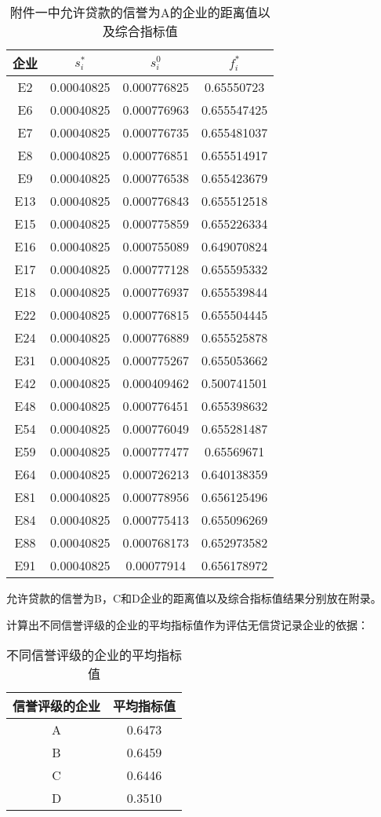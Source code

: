 \documentclass{cumcmthesis}
\begin{document}
\begin{table}[H]   %
	\caption{附件一中允许贷款的信誉为A的企业的距离值以及综合指标值}\label{tab:010} \centering
	\begin{tabular}{cccc}
		\toprule[1.5pt]
		企业 & $s_i^*$    & $s_i^0$        & $f_i^*$         \\
		\midrule[1pt]
E2 & 0.00040825 & 0.000776825 & 0.65550723 \\ 
E6 & 0.00040825 & 0.000776963 & 0.655547425 \\ 
E7 & 0.00040825 & 0.000776735 & 0.655481037 \\ 
E8 & 0.00040825 & 0.000776851 & 0.655514917 \\ 
E9 & 0.00040825 & 0.000776538 & 0.655423679 \\ 
E13 & 0.00040825 & 0.000776843 & 0.655512518 \\ 
E15 & 0.00040825 & 0.000775859 & 0.655226334 \\ 
E16 & 0.00040825 & 0.000755089 & 0.649070824 \\ 
E17 & 0.00040825 & 0.000777128 & 0.655595332 \\ 
E18 & 0.00040825 & 0.000776937 & 0.655539844 \\ 
E22 & 0.00040825 & 0.000776815 & 0.655504445 \\ 
E24 & 0.00040825 & 0.000776889 & 0.655525878 \\ 
E31 & 0.00040825 & 0.000775267 & 0.655053662 \\
E42 & 0.00040825 & 0.000409462 & 0.500741501 \\
E48 & 0.00040825 & 0.000776451 & 0.655398632 \\ 
E54 & 0.00040825 & 0.000776049 & 0.655281487 \\ 
E59 & 0.00040825 & 0.000777477 & 0.65569671 \\ 
E64 & 0.00040825 & 0.000726213 & 0.640138359 \\
E81 & 0.00040825 & 0.000778956 & 0.656125496 \\
E84 & 0.00040825 & 0.000775413 & 0.655096269 \\ 
E88 & 0.00040825 & 0.000768173 & 0.652973582 \\ 
E91 & 0.00040825 & 0.00077914 & 0.656178972 \\ 
		\bottomrule[1.5pt]
\end{tabular}
\end{table}
允许贷款的信誉为B，C和D企业的距离值以及综合指标值结果分别放在附录。

计算出不同信誉评级的企业的平均指标值作为评估无信贷记录企业的依据：
\begin{table}[H]   %
	\caption{不同信誉评级的企业的平均指标值}\label{tab:16} \centering
	\begin{tabular}{cc}
		\toprule[1.5pt]
		信誉评级的企业 & 平均指标值 \\
		\midrule[1pt]
		A & 0.6473\\
		B & 0.6459\\
		C & 0.6446\\
		D & 0.3510\\
		\bottomrule[1.5pt]
	\end{tabular}
\end{table}
\end{document}

